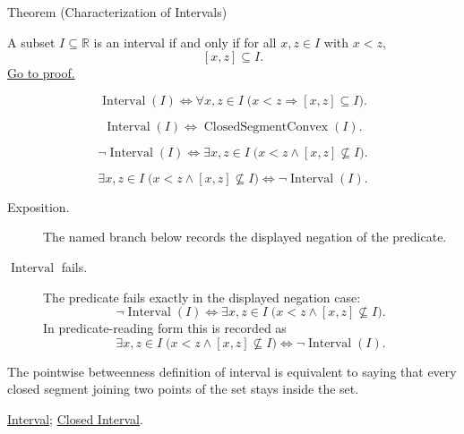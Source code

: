 \begin{theorembox}{Theorem (Characterization of Intervals)}
\begin{theorem}
\label{thm:interval-characterization}
A subset $I\subseteq\mathbb{R}$ is an interval if and only if for all $x,z\in I$
with $x<z$,
\[
[x,z]\subseteq I.
\]
\hyperref[prf:interval-characterization]{Go to proof.}
\end{theorem}
\end{theorembox}
\begin{remark*}
\[
\operatorname{Interval}(I)
\Longleftrightarrow
\forall x,z\in I\;\bigl(x<z\Rightarrow [x,z]\subseteq I\bigr).
\]
\end{remark*}
\begin{remark*}
\[
\operatorname{Interval}(I)
\Longleftrightarrow
\operatorname{ClosedSegmentConvex}(I).
\]
\end{remark*}
\begin{remark*}
\[
\neg\operatorname{Interval}(I)
\Longleftrightarrow
\exists x,z\in I\;\bigl(x<z\land [x,z]\nsubseteq I\bigr).
\]
\end{remark*}
\begin{remark*}
\[
\exists x,z\in I\;\bigl(x<z\land [x,z]\nsubseteq I\bigr)
\Longleftrightarrow
\neg\operatorname{Interval}(I).
\]
\end{remark*}

\begin{remark*}
\begin{description}
  \item[Exposition.] The named branch below records the displayed negation of the predicate.
  \item[\(\operatorname{Interval}\) fails.] The predicate fails exactly in the displayed negation case:
  \[
  \neg\operatorname{Interval}(I)
  \Longleftrightarrow
  \exists x,z\in I\;\bigl(x<z\land [x,z]\nsubseteq I\bigr).
  \]
  In predicate-reading form this is recorded as
  \[
  \exists x,z\in I\;\bigl(x<z\land [x,z]\nsubseteq I\bigr)
  \Longleftrightarrow
  \neg\operatorname{Interval}(I).
  \]
\end{description}
\end{remark*}
\begin{remark*}[Interpretation]
The pointwise betweenness definition of interval is equivalent to saying that
every closed segment joining two points of the set stays inside the set.
\end{remark*}
\begin{dependencies}
\hyperref[def:interval]{Interval};
\hyperref[def:closed-interval]{Closed Interval}.
\end{dependencies}

